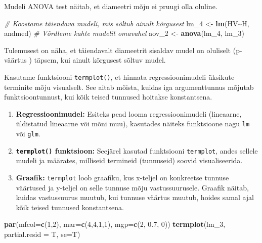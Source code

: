 \documentclass[
]{book}
\newenvironment{Shaded}{\begin{snugshade}}{\end{snugshade}}
\newcommand{\AttributeTok}[1]{\textcolor[rgb]{0.13,0.29,0.53}{#1}}
\newcommand{\CommentTok}[1]{\textcolor[rgb]{0.56,0.35,0.01}{\textit{#1}}}
\newcommand{\DecValTok}[1]{\textcolor[rgb]{0.00,0.00,0.81}{#1}}
\newcommand{\FloatTok}[1]{\textcolor[rgb]{0.00,0.00,0.81}{#1}}
\newcommand{\FunctionTok}[1]{\textcolor[rgb]{0.13,0.29,0.53}{\textbf{#1}}}
\newcommand{\NormalTok}[1]{#1}
\newcommand{\OtherTok}[1]{\textcolor[rgb]{0.56,0.35,0.01}{#1}}
\newcommand{\SpecialCharTok}[1]{\textcolor[rgb]{0.81,0.36,0.00}{\textbf{#1}}}
\providecommand{\tightlist}{%
  \setlength{\itemsep}{0pt}\setlength{\parskip}{0pt}}
\renewenvironment{Shaded} {\begin{snugshade}\footnotesize} {\end{snugshade}}
\begin{document}
Mudeli ANOVA test näitab, et diameetri mõju ei pruugi olla oluline.

\begin{Shaded}
\begin{Highlighting}[]
\CommentTok{\# Koostame täiendava mudeli, mis sõltub ainult kõrgusest}
\NormalTok{lm\_4 }\OtherTok{\textless{}{-}} \FunctionTok{lm}\NormalTok{(HV}\SpecialCharTok{\textasciitilde{}}\NormalTok{H, andmed)}
\CommentTok{\# Võrdleme kahte mudelit omavahel}
\NormalTok{aov\_2 }\OtherTok{\textless{}{-}} \FunctionTok{anova}\NormalTok{(lm\_4, lm\_3)}
\end{Highlighting}
\end{Shaded}

Tulemusest on näha, et täiendavalt diameetrit sisaldav mudel on oluliselt (p-väärtus ) täpsem, kui ainult kõrgusest sõltuv mudel.

Kasutame funktsiooni \texttt{termplot()}, et hinnata regressioonimudeli üksikute terminite mõju visualselt. See aitab mõista, kuidas iga argumenttunnus mõjutab funktsioontunnust, kui kõik teised tunnused hoitakse konstantsena.

\begin{enumerate}
\def\labelenumi{\arabic{enumi}.}
\tightlist
\item
  \textbf{Regressioonimudel:} Esiteks pead looma regressioonimudeli (lineaarne, üldistatud lineaarne või mõni muu), kasutades näiteks funktsioone nagu \texttt{lm} või \texttt{glm}.
\item
  \textbf{\texttt{termplot()} funktsioon:} Seejärel kasutad funktsiooni \texttt{termplot}, andes sellele mudeli ja määrates, milliseid termineid (tunnuseid) soovid visualiseerida.
\item
  \textbf{Graafik:} \texttt{termplot} loob graafiku, kus x-teljel on konkreetse tunnuse väärtused ja y-teljel on selle tunnuse mõju vastussuurusele. Graafik näitab, kuidas vastussuurus muutub, kui tunnuse väärtus muutub, hoides samal ajal kõik teised tunnused konstantsena.
\end{enumerate}

\begin{Shaded}
\begin{Highlighting}[]
\FunctionTok{par}\NormalTok{(}\AttributeTok{mfcol=}\FunctionTok{c}\NormalTok{(}\DecValTok{1}\NormalTok{,}\DecValTok{2}\NormalTok{), }\AttributeTok{mar=}\FunctionTok{c}\NormalTok{(}\DecValTok{4}\NormalTok{,}\DecValTok{4}\NormalTok{,}\DecValTok{1}\NormalTok{,}\DecValTok{1}\NormalTok{), }\AttributeTok{mgp=}\FunctionTok{c}\NormalTok{(}\DecValTok{2}\NormalTok{, }\FloatTok{0.7}\NormalTok{, }\DecValTok{0}\NormalTok{))}
\FunctionTok{termplot}\NormalTok{(lm\_3, }\AttributeTok{partial.resid =}\NormalTok{ T, }\AttributeTok{se=}\NormalTok{T)}
\end{Highlighting}
\end{Shaded}
\end{document}
